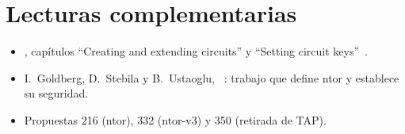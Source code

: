 \section*{Lecturas complementarias}
\begin{itemize}
  \item {}, capítulos \enquote{Creating and extending circuits} y \enquote{Setting circuit keys}~\cite{torspec}.
  \item I.~Goldberg, D.~Stebila y B.~Ustaoglu, ~\cite{goldberg2013ntor}: trabajo que define ntor y establece su seguridad.
  \item Propuestas 216 (ntor), 332 (ntor-v3) y 350 (retirada de TAP).
\end{itemize}
